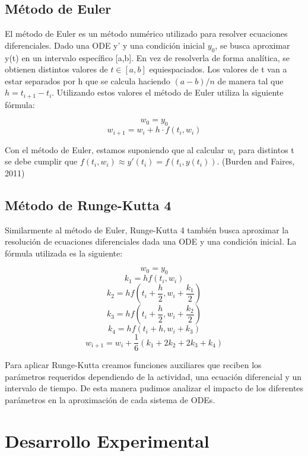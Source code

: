 \documentclass{article}
\begin{document}
\subsection*{Método de Euler}

\noindent El método de Euler es un método numérico utilizado para resolver ecuaciones diferenciales. Dado una ODE y' y una condición inicial $y_{0}$, se busca aproximar y(t) en un intervalo específico [a,b]. En vez de resolverla de forma analítica, se obtienen distintos valores de $t \in [a,b]$ equiespaciados. Los valores de t van a estar separados por h que se calcula haciendo $(a-b)/n$ de manera tal que $h = t_{i+1} - t_{i}$. Utilizando estos valores el método de Euler utiliza la siguiente fórmula:

\setlength{\baselineskip}{0.75\baselineskip}
\[ w_{0} = y_{0} \]
\[ w_{i+1} = w_{i} + h \cdot f(t_{i}, w_{i}) \]
\setlength{\abovedisplayskip}{-6pt}
\vspace{0.5\baselineskip}

\noindent Con el método de Euler, estamos suponiendo que al calcular $w_{i}$ para distintos t se debe cumplir que $f(t_{i},w_{i}) \approx y'(t_{i}) = f(t_{i},y(t_{i}))$. (Burden and Faires, 2011)

\subsection*{Método de Runge-Kutta 4}

\noindent Similarmente al método de Euler, Runge-Kutta 4 también busca aproximar la resolución de ecuaciones diferenciales dada una ODE y una condición inicial. La fórmula utilizada es la siguiente:

\setlength{\baselineskip}{0.75\baselineskip}
\[ w_{0} = y_{0} \]
\[k_{1} = hf(t_{i}, w_{i})\]
\[k_{2} = hf(t_{i} + \frac{h}{2}, w_{i} + \frac{k_{1}}{2})
\]
\[
k_{3} = hf(t_{i} + \frac{h}{2}, w_{i} + \frac{k_{2}}{2})
\]
\[
k_{4} = hf(t_{i} + h, w_{i} + k_{3})\]
\[w_{i+1} = w_{i} + \frac{1}{6}(k_{1} + 2k_{2} + 2k_{3} + k_{4})
\]

\setlength{\abovedisplayskip}{-6pt}

\noindent Para aplicar Runge-Kutta creamos funciones auxiliares que reciben los parámetros requeridos dependiendo de la actividad, una ecuación diferencial y un intervalo de tiempo. De esta manera pudimos analizar el impacto de los diferentes parámetros en la aproximación de cada sistema de ODEs.


\section*{Desarrollo Experimental}
\end{document}
